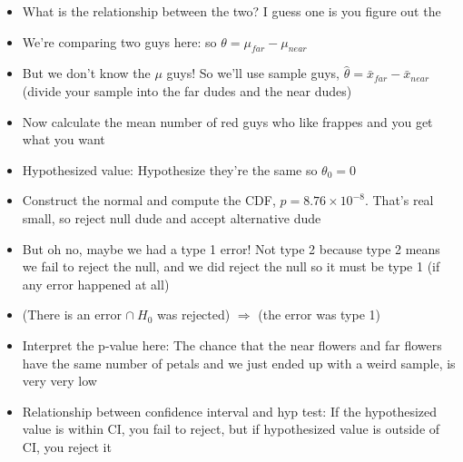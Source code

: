 \documentclass{article}
\begin{document}
\begin{itemize}
       \item What is the relationship between the two? I guess one is you figure out the
       \item We're comparing two guys here: so $ \theta = \mu_{far} - \mu_{near} $
       \item But we don't know the  $ \mu $ guys! So we'll use sample guys,  $ \hat{\theta} = \bar{x}_{far} - \bar{x}_{near} $ (divide your sample into the far dudes and the near dudes)
       \item Now calculate the mean number of red guys who like frappes and you get what you want
       \item Hypothesized value: Hypothesize they're the same so $ \theta_0 = 0 $
       \item Construct the normal and compute the CDF, $ p = 8.76 \times 10^{-8} $. That's real small, so reject null dude and accept alternative dude
       \item But oh no, maybe we had a type 1 error! Not type 2 because type 2 means we fail to reject the null, and we did reject the null so it must be type 1 (if any error happened at all)
       \item (There is an error $ \cap~H_0 $ was rejected)  $ \Rightarrow $ (the error was type 1)
       \item Interpret the p-value here: The chance that the near flowers and far flowers have the same number of petals and we just ended up with a weird sample, is very very low
       \item Relationship between confidence interval and hyp test: If the hypothesized value is within CI, you fail to reject, but if hypothesized value is outside of CI, you reject it
  \end{itemize}
\end{document}
